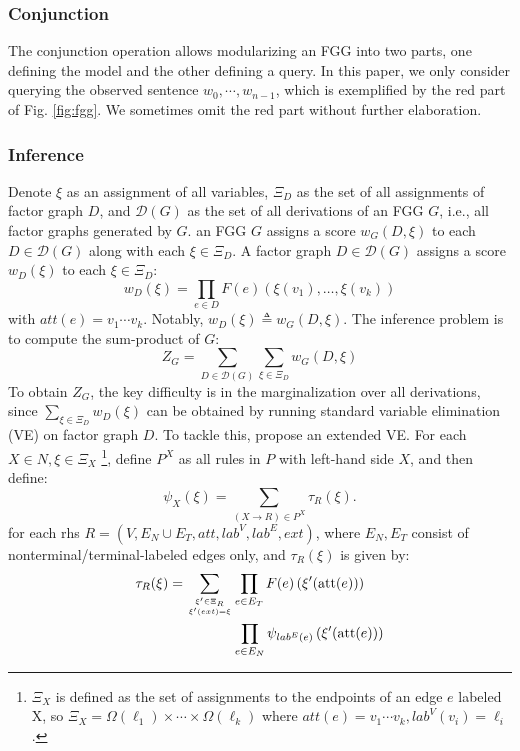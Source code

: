 \documentclass[11pt]{article}
\begin{document}
\subsubsection{Conjunction}
The conjunction operation  \cite[][{Sec. 4}]{DBLP:conf/nips/0001R20} allows modularizing an FGG into two parts, one defining the model and the other defining a query. In this paper, we only consider querying the observed sentence  $w_0,\cdots,w_{n-1}$, 
which is exemplified by the red part of Fig. \ref{fig:fgg}. We sometimes omit the red part without further elaboration.

\subsubsection{Inference} 
  Denote $\xi$ as an assignment of all variables, $\Xi_{D}$ as the set of all assignments of factor graph $D$,  and $\mathcal{D}(G)$ as the set of all derivations of an FGG $G$, i.e., all factor graphs generated by $G$. 
an FGG $G$ assigns a score $w_{G}(D, \xi)$ to each $D \in \mathcal{D}(G)$  along with each $\xi \in \Xi_{D}$. A factor graph $D \in \mathcal{D}(G)$ assigns a score $w_{D}(\xi)$ to each $\xi \in \Xi_D$:
\begin{equation}
     w_D(\xi)= \prod_{e\in D} F(e)(\xi(v_1), \ldots, \xi(v_k))
\end{equation}
with $att(e) = v_1\cdots v_k$.  Notably, $w_{D}(\xi) \triangleq w_{G}(D, \xi)$. The inference problem is to compute the sum-product of $G$:
\begin{equation}
Z_{G} =\sum_{D \in \mathcal{D}(G)} \sum_{\xi \in \Xi_{D}} w_{G}(D, \xi) \label{eq:logZ} 
\end{equation}
To obtain $Z_G$, the key difficulty is in the marginalization over all derivations, since $\sum_{\xi \in \Xi_{D}} w_{D}(\xi)$ can be obtained by running standard variable elimination (VE) on factor graph $D$. To tackle this, \citet[][]{DBLP:conf/nips/0001R20} propose an extended VE.
For each $X \in N, \xi \in \Xi_{X}$ \footnote{$\Xi_{X}$ is defined as the set of assignments to the endpoints of an edge $e$ labeled X, so $\Xi_{X}=\Omega\left(\ell_{1}\right) \times \cdots \times \Omega\left(\ell_{k}\right)$ where $att(e) = v_1 \cdots v_k, lab^V(v_i)=\ell_i$.}, define $P^X$ as all rules in $P$ with left-hand side $X$, and then define:
\begin{equation}
  \psi_X(\xi) = \sum_{(X \rightarrow R) \in P^X} \tau_R(\xi).
  \label{eq:inference_1}
\end{equation}
for each rhs $R = (V, E_N \cup E_T, att, lab^V, lab^E, ext)$, where $E_N,E_T$ consist of nonterminal/terminal-labeled edges only, and  $\tau_R(\xi)$ is given by:
\begin{equation}
\begin{aligned}
\tau_{R}(\xi)=\sum_{\xi^{\prime} \in \Xi_{R} \atop \xi^{\prime}(e x t)=\xi} & \prod_{e \in E_{T}} F(e)\left(\xi^{\prime}(\operatorname{att}(e))\right) \\ &\prod_{e \in E_{N}} \psi_{l a b^{E}(e)}\left(\xi^{\prime}(\operatorname{att}(e))\right)
\label{eq:inference_2}
\end{aligned}
\end{equation}
\end{document}
